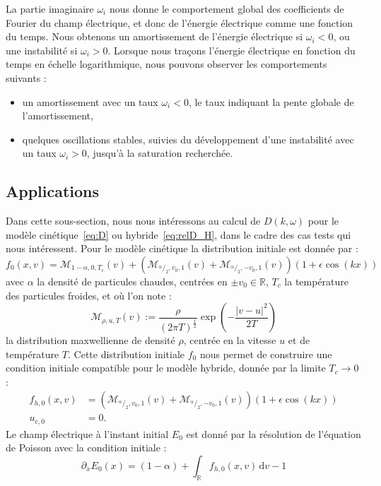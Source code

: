 La partie imaginaire $\omega_i$ nous donne le comportement global des coefficients de Fourier du champ électrique, et donc de l'énergie électrique comme une fonction du temps. Nous obtenons un amortissement de l'énergie électrique si $\omega_i < 0$, ou une instabilité si $\omega_i >0$. Lorsque nous traçons l'énergie électrique en fonction du temps en échelle logarithmique, nous pouvons observer les comportements suivants :
\begin{itemize}
  \item un amortissement avec un taux $\omega_i<0$, le taux indiquant la pente globale de l'amortissement,
  \item quelques oscillations stables, suivies du développement d'une instabilité avec un taux $\omega_i>0$, jusqu'à la saturation recherchée.
\end{itemize}

\subsection{Applications}\label{ssec:disp_appl}

Dans cette sous-section, nous nous intéressons au calcul de $D(k,\omega)$ pour le modèle cinétique~\eqref{eq:D} ou hybride~\eqref{eq:relD_H}, dans le cadre des cas tests qui nous intéressent. Pour le modèle cinétique la distribution initiale est donnée par :
$$
  f_0(x,v) = \mathcal{M}_{1-\alpha,0,T_c}(v)
    + \left(
      \mathcal{M}_{^\alpha/_2,v_0,1}(v) + \mathcal{M}_{^\alpha/_2,-v_0,1}(v)
    \right)(1+\epsilon\cos(kx))
$$
avec $\alpha$ la densité de particules chaudes, centrées en $\pm v_0\in\mathbb{R}$, $T_c$ la température des particules froides, et où l'on note :
$$
  \mathcal{M}_{\rho,u,T}(v) := \frac{\rho}{(2\pi T)^\frac{1}{2}}\exp\left(-\frac{|v-u|^2}{2T}\right)
$$
la distribution maxwellienne de densité $\rho$, centrée en la vitesse $u$ et de température $T$. Cette distribution initiale $f_0$ nous permet de construire une condition initiale compatible pour le modèle hybride, donnée par la limite $T_c\to 0$ :
\begin{equation}
  \begin{aligned}
    f_{h,0} (x,v) & = \left(
      \mathcal{M}_{^\alpha/_2,v_0,1}(v) + \mathcal{M}_{^\alpha/_2,-v_0,1}(v)
    \right)(1+\epsilon\cos(kx)) \\
    u_{c,0} & = 0.
  \end{aligned}
\label{eq:f0hdexv}\end{equation}
Le champ électrique à l'instant initial $E_0$ est donné par la résolution de l'équation de Poisson avec la condition initiale :
$$
  \partial_x E_0(x) = (1-\alpha) + \int_\mathbb{R}f_{h,0}(x,v)\,\mathrm{d}v - 1
$$

